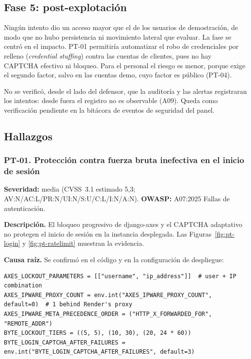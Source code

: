 \documentclass[stu,12pt,floatsintext]{apa7}
\begin{document}
\subsection{Fase 5: post-explotación}

Ningún intento dio un acceso mayor que el de los usuarios de demostración, de modo que no hubo
persistencia ni movimiento lateral que evaluar. La fase se centró en el impacto. PT-01 permitiría
automatizar el robo de credenciales por relleno (\textit{credential stuffing}) contra las cuentas de
clientes, pues no hay CAPTCHA efectivo ni bloqueo. Para el personal el riesgo es menor, porque exige el
segundo factor, salvo en las cuentas demo, cuyo factor es público (PT-04).

No se verificó, desde el lado del defensor, que la auditoría y las alertas registraran los intentos:
desde fuera el registro no es observable (A09). Queda como verificación pendiente en la bitácora de
eventos de seguridad del panel.

\subsection{Hallazgos}

\subsubsection{PT-01. Protección contra fuerza bruta inefectiva en el inicio de sesión}

\textbf{Severidad:} media (CVSS~3.1 estimado 5,3; AV:N/AC:L/PR:N/UI:N/S:U/C:L/I:N/A:N). \textbf{OWASP:}
A07:2025 Fallas de autenticación.

\textbf{Descripción.} El bloqueo progresivo de django-axes y el CAPTCHA adaptativo no protegen el
inicio de sesión en la instancia desplegada. Las Figuras~\ref{fig:pt-login} y \ref{fig:pt-ratelimit}
muestran la evidencia.

\textbf{Causa raíz.} Se confirmó en el código y en la configuración de despliegue:

\begin{Verbatim}
AXES_LOCKOUT_PARAMETERS = [["username", "ip_address"]]  # user + IP combination
AXES_IPWARE_PROXY_COUNT = env.int("AXES_IPWARE_PROXY_COUNT", default=0)  # 1 behind Render's proxy
AXES_IPWARE_META_PRECEDENCE_ORDER = ("HTTP_X_FORWARDED_FOR", "REMOTE_ADDR")
BYTE_LOCKOUT_TIERS = ((5, 5), (10, 30), (20, 24 * 60))
BYTE_LOGIN_CAPTCHA_AFTER_FAILURES = env.int("BYTE_LOGIN_CAPTCHA_AFTER_FAILURES", default=3)
\end{Verbatim}
\end{document}

